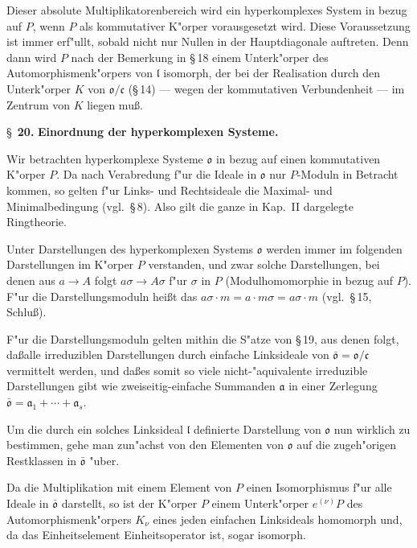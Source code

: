 \documentclass[12pt,a4paper]{article}
\theoremstyle{plain}
\begin{document}
Dieser absolute Multiplikatorenbereich wird ein hyperkomplexes System in bezug auf $P$, wenn $P$ als kommutativer K"orper vorausgesetzt wird. Diese Voraussetzung ist immer erf"ullt, sobald nicht nur Nullen in der Hauptdiagonale auftreten. Denn dann wird $P$ nach der Bemerkung in \S\,18 einem Unterk"orper des Automorphismenk"orpers von $\mathfrak{l}$ isomorph, der bei der Realisation durch den Unterk"orper $K$ von $\mathfrak{o}/\mathfrak{c}$ (\S\,14) --- wegen der kommutativen Verbundenheit --- im Zentrum von $K$ liegen mu\ss.

\newpage
\S~\textbf{20.}
\textbf{Einordnung der hyperkomplexen Systeme.}

\smallskip

\noindent
Wir betrachten hyperkomplexe Systeme $\mathfrak{o}$ in bezug auf einen kommutativen K"orper $P$. Da nach Verabredung f"ur die Ideale in $\mathfrak{o}$ nur $P$-Moduln in Betracht kommen, so gelten f"ur Links- und Rechtsideale die Maximal- und Minimalbedingung (vgl.\ \S\,8). Also gilt die ganze in Kap.\ II dargelegte Ringtheorie.

Unter Darstellungen des hyperkomplexen Systems $\mathfrak{o}$ werden immer im folgenden Darstellungen im K"orper $P$ verstanden, und zwar solche Darstellungen, bei denen aus $a \to A$ folgt $a\sigma \to A\sigma$ f"ur $\sigma$ in $P$ (Modulhomomorphie in bezug auf $P$). F"ur die Darstellungsmoduln hei\ss t das $a\sigma \cdot m = a \cdot m\sigma = a\sigma \cdot m$ (vgl.\ \S\,15, Schlu\ss).

F"ur die Darstellungsmoduln gelten mithin die S"atze von \S\,19, aus denen folgt, da\ss alle irreduziblen Darstellungen durch einfache Linksideale von $\bar{\mathfrak{o}} = \mathfrak{o}/\mathfrak{c}$ vermittelt werden, und da\ss es somit so viele nicht-"aquivalente irreduzible Darstellungen gibt wie zweiseitig-einfache Summanden $\mathfrak{a}$ in einer Zerlegung $\bar{\mathfrak{o}} = \mathfrak{a}_1 + \cdots + \mathfrak{a}_s$.

Um die durch ein solches Linksideal $\mathfrak{l}$ definierte Darstellung von $\mathfrak{o}$ nun wirklich zu bestimmen, gehe man zun"achst von den Elementen von $\mathfrak{o}$ auf die zugeh"origen Restklassen in $\bar{\mathfrak{o}}$ "uber.

Da die Multiplikation mit einem Element von $P$ einen Isomorphismus f"ur alle Ideale in $\bar{\mathfrak{o}}$ darstellt, so ist der K"orper $P$ einem Unterk"orper $e^{(\nu)}P$ des Automorphismenk"orpers $K_\nu$ eines jeden einfachen Linksideals homomorph und, da das Einheitselement Einheitsoperator ist, sogar isomorph.
\end{document}
